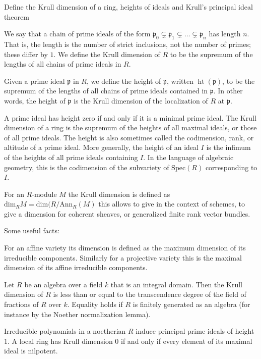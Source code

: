 Define the Krull dimension of a ring, heights of ideals and Krull's principal ideal theorem

We say that a chain of prime ideals of the form
\(\mathfrak{p}_0\subsetneq \mathfrak{p}_1\subsetneq \ldots \subsetneq \mathfrak{p}_n\)
has length \( n \). That is, the length is the number of strict inclusions, not the number of primes; 
these differ by \( 1 \). We define the Krull dimension of \( R \) to be the supremum of the lengths of all chains of prime ideals in \( R \).

Given a prime ideal \(\mathfrak{p}\) in \(R\), we define the height of \(\mathfrak{p}\), written \(\operatorname{ht}(\mathfrak{p})\), 
to be the supremum of the lengths of all chains of prime ideals contained in \(\mathfrak{p}\).
In other words, the height of \( \mathfrak{p} \) is the Krull dimension of the localization of \( R \) at \( \mathfrak{p} \).


A prime ideal has height zero if and only if it is a minimal prime ideal.
The Krull dimension of a ring is the supremum of the heights of all maximal ideals, or those of all prime ideals. 
The height is also sometimes called the codimension, rank, or altitude of a prime ideal.
More generally, the height of an ideal \(I\)  is the infimum of the heights of all prime ideals containing \(I\).  
In the language of algebraic geometry, this is the codimension of the subvariety of \(\mathrm{Spec}(R)\) corresponding to \(I\).

For an \( R \)-module \( M \) the Krull dimension is defined as 
\( \text{dim}_R M = \text{dim}(R / \text{Ann}_R(M) \)
this allows to give in the context of schemes, to give a dimension for coherent sheaves, or generalized finite rank vector bundles.

Some useful facts:

For an affine variety its dimension is defined as the maximum dimension of its irreducible components.
Similarly for a projective variety this is the maximal dimension of its affine irreducible components.

Let \( R \) be an algebra over a field \( k \) that is an integral domain. 
Then the Krull dimension of \( R \) is less than or equal to the transcendence degree of the field of fractions of \( R \) over \( k \). 
Equality holds if \( R \) is finitely generated as an algebra (for instance by the Noether normalization lemma).

Irreducible polynomials in a noetherian \( R \) induce principal prime ideals of height \( 1 \).
A local ring has Krull dimension \( 0 \) if and only if every element of its maximal ideal is nilpotent.

